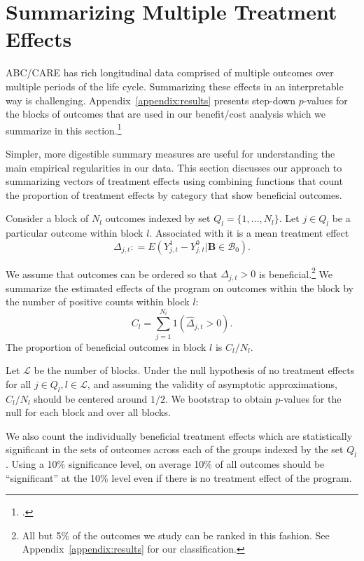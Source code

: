 \section{Summarizing Multiple Treatment Effects} \label{section:methodology}

ABC/CARE has rich longitudinal data comprised of multiple outcomes over multiple periods of the life cycle. Summarizing these effects in an interpretable way is challenging. Appendix~\ref{appendix:results} presents step-down $p$-values for the blocks of outcomes that are used in our benefit/cost analysis which we summarize in this section.\footnote{\citet{Lehman_Romano_2005_AnnStat,Romano_Shaikh_2006_AnnStat}.}

Simpler, more digestible summary measures are useful for understanding the main empirical regularities in our data. This section discusses our approach to summarizing vectors of treatment effects using combining functions that count the proportion of treatment effects by category that show beneficial outcomes.

Consider a block of $N_l$ outcomes indexed by set $Q_l = \{1,\dots,N_l\}$. Let $j \in Q_l$ be a particular outcome within block $l$. Associated with it is a mean treatment effect
\begin{equation}
\Delta_{j,t} : = E(Y^1_{j,t} - Y^0_{j,t} | \bm{B} \in \mathcal{B}_0).
\end{equation}

We assume that outcomes can be ordered so that $\Delta_{j,t} >0$ is beneficial.\footnote{All but 5\% of the outcomes we study can be ranked in this fashion. See Appendix~\ref{appendix:results} for our classification.} We summarize the estimated effects of the program on outcomes within the block by the number of positive counts within block $l$:
\begin{equation}
C_l = \sum^{N_l}_{j=1} 1 (\hat{\Delta}_{j,t} >0).
\end{equation}
The proportion of beneficial outcomes in block $l$ is $C_l / N_l$.

Let $\mathcal{L}$ be the number of blocks. Under the null hypothesis of no treatment effects for all $j \in Q_l, l \in \mathcal{L}$, and assuming the validity of asymptotic approximations, $C_l / N_l$ should be centered around $1/2$. We bootstrap to obtain $p$-values for the null for each block and over all blocks.

We also count the individually beneficial treatment effects which are statistically significant in the sets of outcomes across each of the groups indexed by the set $Q_l$. Using a 10\% significance level, on average 10\% of all outcomes should be ``significant'' at the 10\% level even if there is no treatment effect of the program.

